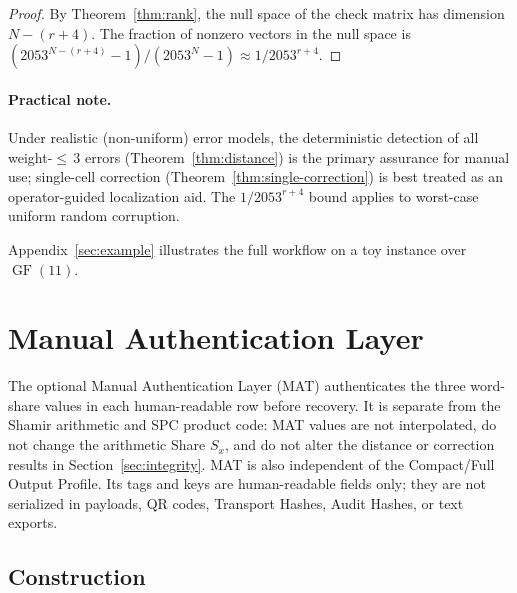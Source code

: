 \documentclass[11pt]{article}
\newcommand{\GF}{\operatorname{GF}}
\begin{document}
\begin{proof}
By Theorem~\ref{thm:rank}, the null space of the check matrix has dimension $N - (r+4)$. The fraction of nonzero vectors in the null space is $(2053^{N-(r+4)} - 1) / (2053^N - 1) \approx 1/2053^{r+4}$.
\end{proof}

\paragraph{Practical note.} Under realistic (non-uniform) error models, the deterministic detection of all weight-${\leq}\,3$ errors (Theorem~\ref{thm:distance}) is the primary assurance for manual use; single-cell correction (Theorem~\ref{thm:single-correction}) is best treated as an operator-guided localization aid. The $1/2053^{r+4}$ bound applies to worst-case uniform random corruption.

Appendix~\ref{sec:example} illustrates the full workflow on a toy instance over $\GF(11)$.

\section{Manual Authentication Layer}
\label{sec:mat}

The optional Manual Authentication Layer (MAT) authenticates the three word-share values in each human-readable row before recovery. It is separate from the Shamir arithmetic and SPC product code: MAT values are not interpolated, do not change the arithmetic Share $S_x$, and do not alter the distance or correction results in Section~\ref{sec:integrity}. MAT is also independent of the Compact/Full Output Profile. Its tags and keys are human-readable fields only; they are not serialized in payloads, QR codes, Transport Hashes, Audit Hashes, or text exports.

\subsection{Construction}
\end{document}
